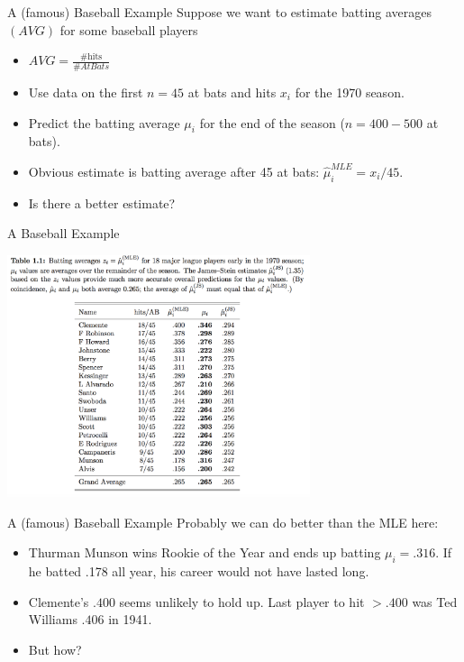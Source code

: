 \documentclass[aspectratio=169]{beamer}
\begin{document}
\begin{frame}[fragile]{A (famous) Baseball Example}
Suppose we want to estimate batting averages $(AVG)$ for some baseball players
\begin{itemize}
\item $AVG = \frac{\# \text{hits}}{ \# At Bats}$
\item Use data on the first $n=45$ at bats and hits $x_i$ for the 1970 season.
\item Predict the batting average $\mu_i$ for the end of the season  ($n=400-500$ at bats).
\item Obvious estimate is batting average after 45 at bats: $\widehat{\mu}_i^{MLE}= x_i/45$.
\item Is there a better estimate?
\end{itemize}
\end{frame}


\begin{frame}[fragile]{A Baseball Example}
\begin{center}
\includegraphics[width=3.5in]{./resources/baseball.png}
\end{center}
\end{frame}

\begin{frame}[fragile]{A (famous) Baseball Example}
Probably we can do better than the MLE here:
\begin{itemize}
\item Thurman Munson wins Rookie of the Year and ends up batting $\mu_i = .316$. If he batted .178 all year, his career would not have lasted long.
\item Clemente's $.400$ seems unlikely to hold up. Last player to hit $> .400$ was Ted Williams $.406$ in 1941.
\item But how?
\end{itemize}
\end{frame}
\end{document}
